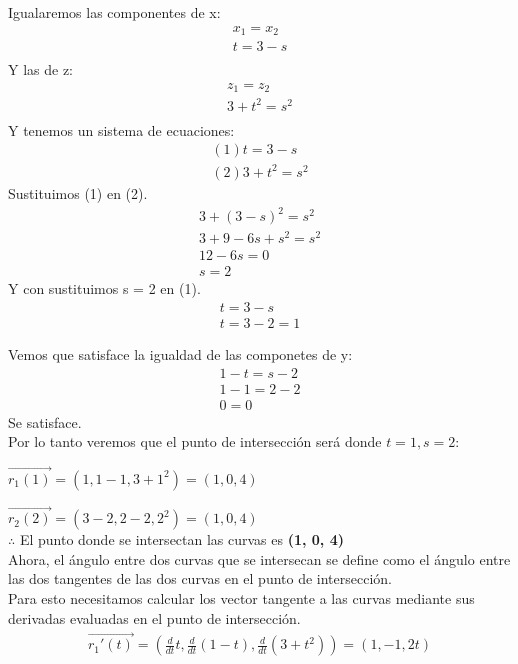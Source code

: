 \documentclass[12pt]{article}
\begin{document}
Igualaremos las componentes de x:
\begin{align*}
   x_1 = x_2 \\
   t =  3-s \\
\end{align*}
Y las de z:
\begin{align*}
   z_1 = z_2 \\
   3+t^2  =  s^{2} \\
\end{align*}
Y tenemos un sistema de ecuaciones:
\begin{align*}
  (1) t =  3-s \\
  (2) 3+t^2  =  s^{2}
\end{align*}
Sustituimos (1) en (2).
\begin{align*}
   3+(3-s)^2  =  s^{2} \\
   3+9-6s+s^2  =  s^{2} \\
   12 -6s =  0 \\
   s = 2
\end{align*}
Y con sustituimos s = 2 en (1).
\begin{align*}
   t =  3-s \\
  t = 3-2 = 1 
\end{align*}

Vemos que satisface la igualdad de las componetes de y:
\begin{align*}
   1-t = s-2 \\
   1-1  = 2-2 \\
   0 = 0
\end{align*}
Se satisface.\\
Por lo tanto veremos que el punto de intersección será donde $t=1, s=2$: \\
\item $\vec{r_1(1)}=(1,1-1,3+1^2) = (1, 0, 4)$

\item $\vec{r_2(2)}=(3-2,2-2,2^2) = (1, 0, 4)$ \\
  $\therefore$ El punto donde se intersectan las curvas es \textbf{(1, 0, 4)}
  \\
  Ahora, el ángulo entre dos curvas que se intersecan se define como el ángulo entre las dos tangentes de las dos curvas en el punto de intersección.\\
  Para esto necesitamos calcular los  vector tangente a las curvas mediante sus derivadas evaluadas en el punto de intersección.
\begin{align*}
    \vec{r_1'(t)} = \left( \frac{d}{dt} t, \frac{d}{dt}  (1-t), \frac{d}{dt} (3+t^2) \right) =  (1, -1, 2t)
\end{align*}
\end{document}
